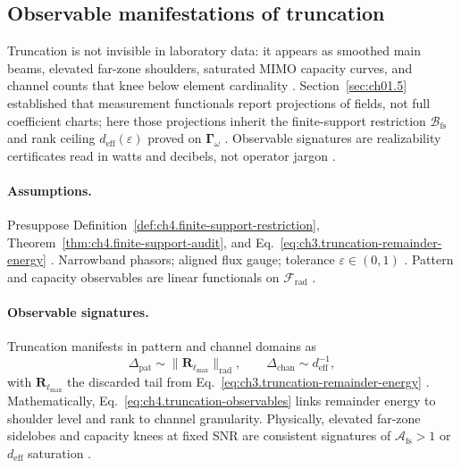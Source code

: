 ﻿\subsection{Observable manifestations of truncation}
\label{sec:ch493}

Truncation is not invisible in laboratory data: it appears as smoothed main beams, elevated far-zone shoulders, saturated MIMO capacity curves, and
channel counts that knee below element cardinality \cite{stratton1941,harrington2001,hansen1988,devaney2004}. Section~\ref{sec:ch01.5} established that
measurement functionals report projections of fields, not full coefficient charts; here those projections inherit the finite-support restriction
\(\mathcal{B}_{\mathrm{fs}}\) and rank ceiling \(d_{\mathrm{eff}}(\varepsilon)\) proved on \(\boldsymbol{\Gamma}_\omega\) \cite{jackson1999}.
Observable signatures are realizability certificates read in watts and decibels, not operator jargon \cite{harrington2001,devaney2004}.

\paragraph{Assumptions.}
Presuppose Definition~\ref{def:ch4.finite-support-restriction}, Theorem~\ref{thm:ch4.finite-support-audit}, and
Eq.~\eqref{eq:ch3.truncation-remainder-energy} \cite{stratton1941,hansen1988,harrington2001}. Narrowband phasors; aligned flux gauge; tolerance
\(\varepsilon\in(0,1)\) \cite{jackson1999,devaney2004}. Pattern and capacity observables are linear functionals on \(\mathcal{F}_{\mathrm{rad}}\)
\cite{collin2001,harrington2001}.

\paragraph{Observable signatures.}
Truncation manifests in pattern and channel domains as
\begin{equation}
\label{eq:ch4.truncation-observables}
\Delta_{\mathrm{pat}}
\sim
\|\mathbf{R}_{\ell_{\max}}\|_{\mathrm{rad}},
\qquad
\Delta_{\mathrm{chan}}
\sim
d_{\mathrm{eff}}^{-1},
\end{equation}
with \(\mathbf{R}_{\ell_{\max}}\) the discarded tail from Eq.~\eqref{eq:ch3.truncation-remainder-energy} \cite{hansen1988,stratton1941,harrington2001}.
Mathematically, Eq.~\eqref{eq:ch4.truncation-observables} links remainder energy to shoulder level and rank to channel granularity. Physically, elevated
far-zone sidelobes and capacity knees at fixed SNR are consistent signatures of \(\mathcal{A}_{\mathrm{fs}}>1\) or \(d_{\mathrm{eff}}\) saturation
\cite{devaney2004,jackson1999,collin2001}.


